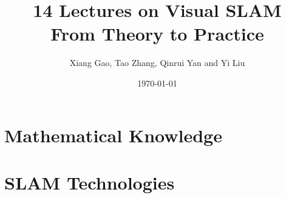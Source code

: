 \documentclass[a4paper,9pt,openleft]{book}
\begin{document}
\title{14 Lectures on Visual SLAM\\From Theory to Practice}
\author{Xiang Gao, Tao Zhang, Qinrui Yan and Yi Liu}
\date{\today}

\frontmatter
\maketitle




\tableofcontents




\mainmatter 
{}
\hypersetup{bookmarksdepth=2}



\part{Mathematical Knowledge}






\part{SLAM Technologies}









\appendix
{}
\hypersetup{bookmarksdepth=2}




\backmatter
\small


\newpage
\end{document}
